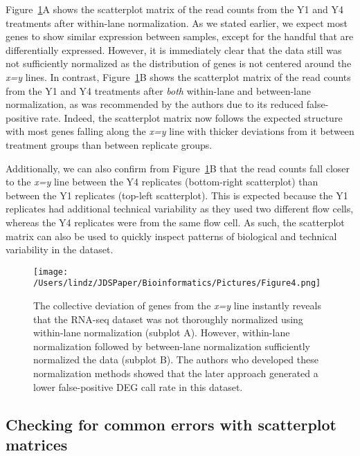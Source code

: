 \documentclass[useAMS,referee]{biom}
\begin{document}
Figure~\ref{withinbtwn}A shows the scatterplot matrix of the read counts from the Y1 and Y4 treatments after within-lane normalization. As we stated earlier, we expect most genes to show similar expression between samples, except for the handful that are differentially expressed. However, it is immediately clear that the data still was not sufficiently normalized as the distribution of genes is not centered around the \textit{x=y} lines. In contrast, Figure~\ref{withinbtwn}B shows the scatterplot matrix of the read counts from the Y1 and Y4 treatments after \textit{both} within-lane and between-lane normalization, as was recommended by the authors due to its reduced false-positive rate. Indeed, the scatterplot matrix now follows the expected structure with most genes falling along the \textit{x=y} line with thicker deviations from it between treatment groups than between replicate groups.

Additionally, we can also confirm from Figure~\ref{withinbtwn}B that the read counts fall closer to the \textit{x=y} line between the Y4 replicates (bottom-right scatterplot) than between the Y1 replicates (top-left scatterplot). This is expected because the Y1 replicates had additional technical variability as they used two different flow cells, whereas the Y4 replicates were from the same flow cell. As such, the scatterplot matrix can also be used to quickly inspect patterns of biological and technical variability in the dataset.

\begin{figure}
\begin{center}
\centerline{\texttt{[image: /Users/lindz/JDSPaper/Bioinformatics/Pictures/Figure4.png]}}
\end{center}
\caption{The collective deviation of genes from the \textit{x=y} line instantly reveals that the RNA-seq dataset was not thoroughly normalized using within-lane normalization (subplot A). However, within-lane normalization followed by between-lane normalization sufficiently normalized the data (subplot B). The authors who developed these normalization methods showed that the later approach generated a lower false-positive DEG call rate in this dataset.
\label{withinbtwn}}
\end{figure}

\subsection{Checking for common errors with scatterplot matrices}
\label{s:Checking for common errors with scatterplot matrices}
\end{document}

